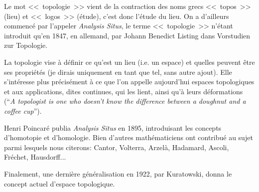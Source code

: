 \begin{histoire}%
Le mot <<~topologie~>> vient de la contraction des noms grecs <<~topos~>> (lieu) et <<~logos~>>  (étude),
c'est donc l'étude du lieu.  On a d'ailleurs commencé par l'appeler \emph{Analysis Situs}, le terme
<<~topologie~>> n'étant introduit qu'en 1847, en allemand, par Johann Benedict Listing
dans Vorstudien zur Topologie.

La topologie vise à définir ce qu'est un lieu (i.e. un espace) et quelles peuvent être ses propriétés
(je dirais uniquement en tant que tel, sans autre ajout).
Elle s'intéresse plus précisément à ce que l'on appelle aujourd'hui espaces topologiques et aux
applications, dites continues, qui les lient, ainsi qu'à leurs déformations
(``\emph{A topologist is one who doesn't know the difference between a doughnut and a coffee cup}'').

\medskip
{}

Henri Poincaré
 publia \emph{Analysis Situs} en 1895, introduisant les concepts d'homotopie et d'homologie.
Bien d'autres mathématiciens ont contribué au sujet parmi lesquels nous citerons:
Cantor, Volterra, Arzelà, Hadamard, Ascoli, Fréchet, Hausdorff...

%
Finalement, une dernière généralisation en 1922, par Kuratowski, donna le concept actuel d'espace
topologique.
\end{histoire}


